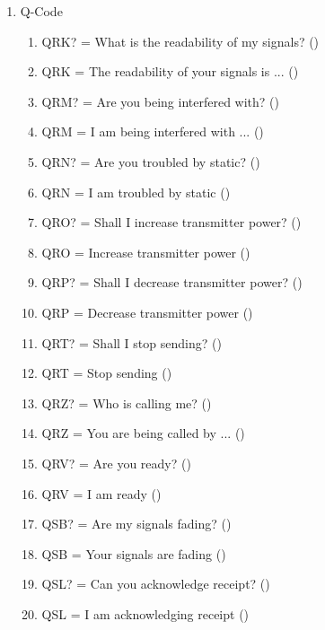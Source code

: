 \begin{flushleft}
\begin{enumerate}
\item Q-Code
\begin{enumerate}
\item QRK? = What is the readability of my signals?
  ()\label{HAREC.b.2.1}
\item QRK  = The readability of your signals is ...
  ()\label{HAREC.b.2.2}
\item QRM? = Are you being interfered with?
  ()\label{HAREC.b.2.3}
\item QRM  = I am being interfered with ...
  ()\label{HAREC.b.2.4}
\item QRN? = Are you troubled by static?
  ()\label{HAREC.b.2.5}
\item QRN  = I am troubled by static
  ()\label{HAREC.b.2.6}
\item QRO? = Shall I increase transmitter power?
  ()\label{HAREC.b.2.7}
\item QRO  = Increase transmitter power
  ()\label{HAREC.b.2.8}
\item QRP? = Shall I decrease transmitter power?
  ()\label{HAREC.b.2.9}
\item QRP  = Decrease transmitter power
  ()\label{HAREC.b.2.10}
\item QRT? = Shall I stop sending?
  ()\label{HAREC.b.2.11}
\item QRT  = Stop sending
  ()\label{HAREC.b.2.12}
\item QRZ? = Who is calling me?
  ()\label{HAREC.b.2.13}
\item QRZ  = You are being called by ...
  ()\label{HAREC.b.2.14}
\item QRV? = Are you ready?
  ()\label{HAREC.b.2.15}
\item QRV  = I am ready
  ()\label{HAREC.b.2.16}
\item QSB? = Are my signals fading?
  ()\label{HAREC.b.2.17}
\item QSB  = Your signals are fading
  ()\label{HAREC.b.2.18}
\item QSL? = Can you acknowledge receipt?
  ()\label{HAREC.b.2.19}
\item QSL  = I am acknowledging receipt
  ()\label{HAREC.b.2.20}

\end{enumerate}
\end{enumerate}
\end{flushleft}

